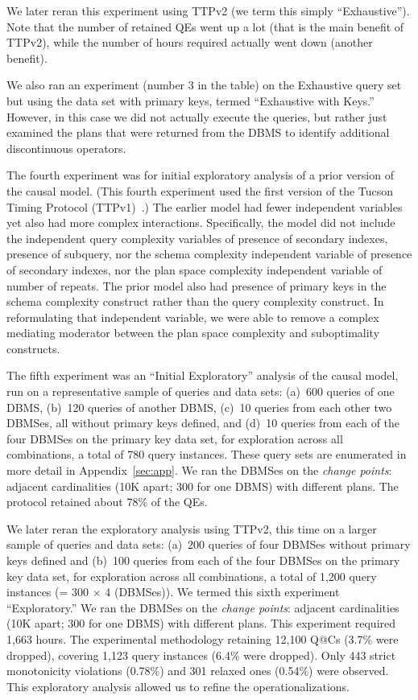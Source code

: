 \documentclass[prodmode,acmtods]{acmsmall}
\makeatletter
\def\QatC{Q{@}C}
\makeatother
\begin{document}
We later reran this experiment using TTPv2 (we term this simply
``Exhaustive''). Note that the number of retained QEs went up a lot (that is
the main benefit of TTPv2), while the number of hours required actually
went down (another benefit).

We also ran an experiment (number 3 in the table) on the Exhaustive query set but using the data
set with primary keys, termed ``Exhaustive with Keys.'' However, in this
case we did not actually execute 
the queries, but rather just examined the plans that were returned from the
\hbox{DBMS} to identify additional discontinuous operators. 

The fourth experiment was for initial exploratory analysis of a prior
version of the causal model. (This fourth experiment used
the first version of the Tucson Timing Protocol (TTPv1)~\cite{TTPv1}.)
The earlier model had fewer independent
variables yet also had more complex interactions. Specifically, the model
did not include the independent query complexity variables of presence of
secondary indexes, presence of subquery, nor the schema complexity
independent variable of presence of secondary indexes, nor the plan space
complexity independent variable of number of repeats. The prior model also
had presence of primary keys in the schema complexity construct rather than
the query complexity construct. In reformulating that independent variable,
we were able to remove a complex mediating moderator between the plan
space complexity and suboptimality constructs. 

The fifth experiment was an ``Initial Exploratory'' analysis of the causal model, run on
a representative sample of queries and data sets: (a)~600 queries of one
\hbox{DBMS}, (b)~120 queries of another \hbox{DBMS}, (c)~10 queries
from each other two \hbox{DBMSes}, all without primary keys defined, and (d)~10 queries
from each of the four \hbox{DBMSes} on the primary key data set, for exploration
across all combinations, a total of 780 query instances. These query sets
are enumerated in more detail in Appendix~\ref{sec:app}.
We ran the \hbox{DBMSes} on the {\em
  change points}: adjacent cardinalities (10K apart; 300 for one \hbox{DBMS}) with different
plans. The protocol retained about 78\% of the QEs.

We later reran the exploratory analysis using TTPv2, this time on a larger sample of queries and data sets:
(a)~200 queries of four \hbox{DBMSes} without primary keys defined and
(b)~100 queries from each of the four \hbox{DBMSes} on the primary key data set,
for exploration across all combinations, a total of 1,200 query instances (= 300 $\times$ 4 (DBMSes)).
We termed this sixth experiment ``Exploratory.''  We ran the DBMSes on the {\em
  change points}: adjacent cardinalities (10K apart; 300 for one DBMS) with different
plans. This experiment required 1,663 hours. The experimental
methodology retaining 12,100 {\QatC}s (3.7\% were dropped), covering 1,123 query
instances (6.4\% were dropped). Only 443 strict monotonicity violations (0.78\%) and 301 relaxed
ones (0.54\%) were observed. This exploratory analysis allowed us to refine
the operationalizations.
\end{document}
